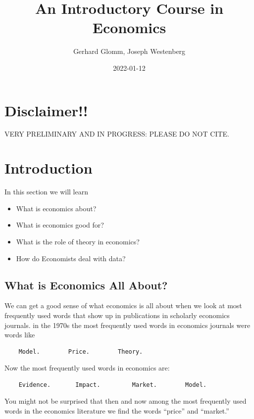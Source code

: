 \documentclass[
]{book}
\title{An Introductory Course in Economics}
\author{Gerhard Glomm, Joseph Westenberg}
\date{2022-01-12}
\providecommand{\tightlist}{%
  \setlength{\itemsep}{0pt}\setlength{\parskip}{0pt}}
\begin{document}
\maketitle

{
\setcounter{tocdepth}{1}
\tableofcontents
}
\hypertarget{disclaimer}{%
\chapter{Disclaimer!!}\label{disclaimer}}

VERY PRELIMINARY AND IN PROGRESS: PLEASE DO NOT CITE.

\hypertarget{intro}{%
\chapter{Introduction}\label{intro}}

In this section we will learn

\begin{itemize}
\tightlist
\item
  What is economics about?
\item
  What is economics good for?
\item
  What is the role of theory in economics?
\item
  How do Economists deal with data?
\end{itemize}

\hypertarget{what-is-economics-all-about}{%
\section{What is Economics All About?}\label{what-is-economics-all-about}}

We can get a good sense of what economics is all about when we look at most frequently used words that show up in publications in scholarly economics journals. in the 1970s the most frequently used words in economics journals were words like

\begin{verbatim}
    Model.        Price.        Theory.
\end{verbatim}

Now the most frequently used words in economics are:

\begin{verbatim}
    Evidence.       Impact.         Market.        Model.
\end{verbatim}

You might not be surprised that then and now among the most frequently used words in the economics literature we find the words ``price'' and ``market.''
\end{document}
